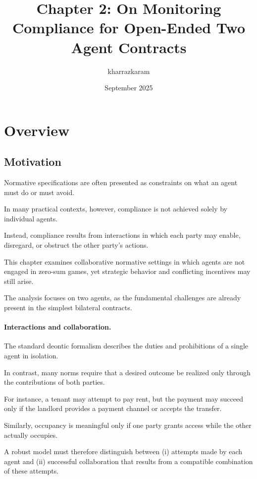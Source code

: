 \documentclass{article}
\title{Chapter 2: On Monitoring Compliance for Open-Ended Two Agent Contracts }
\author{kharrazkaram }
\date{September 2025}
\begin{document}
\maketitle

\tableofcontents
\newpage
\section{Overview}
\subsection{Motivation}

Normative specifications are often presented as constraints on what an agent must do or must avoid.

In many practical contexts, however, compliance is not achieved solely by individual agents.

Instead, compliance results from interactions in which each party may enable, disregard, or obstruct the other party's actions.

This chapter examines collaborative normative settings in which agents are not engaged in zero-sum games, yet strategic behavior and conflicting incentives may still arise.

The analysis focuses on two agents, as the fundamental challenges are already present in the simplest bilateral contracts.



\paragraph{Interactions and collaboration.}

The standard deontic formalism describes the duties and prohibitions of a single agent in isolation.

In contrast, many norms require that a desired outcome be realized only through the contributions of both parties.

For instance, a tenant may attempt to pay rent, but the payment may succeed only if the landlord provides a payment channel or accepts the transfer.

Similarly, occupancy is meaningful only if one party grants access while the other actually occupies.

A robust model must therefore distinguish between (i) attempts made by each agent and (ii) successful collaboration that results from a compatible combination of these attempts.
\end{document}
